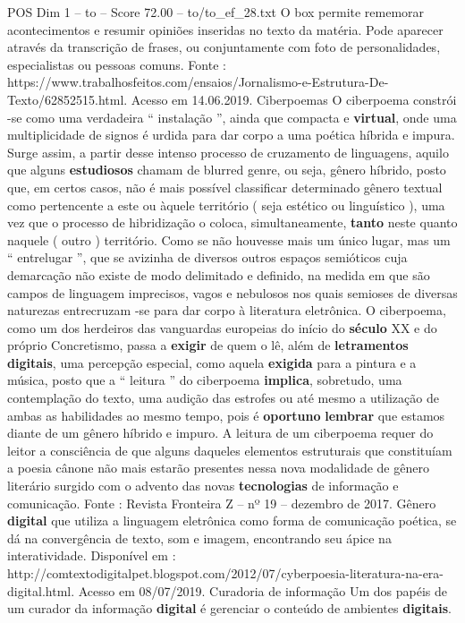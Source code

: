 \begin{textsample}{POS Dim 1 – to – Score 72.00 – to/to\_ef\_28.txt}
O box permite rememorar acontecimentos e resumir opiniões inseridas no texto da matéria.
Pode aparecer através da transcrição de frases, ou conjuntamente com foto de personalidades, especialistas ou pessoas comuns.
Fonte : https://www.trabalhosfeitos.com/ensaios/Jornalismo-e-Estrutura-De-Texto/62852515.html.
Acesso em 14.06.2019.
Ciberpoemas O ciberpoema constrói -se como uma verdadeira “ instalação ”, ainda que compacta e \textbf{virtual}, onde uma multiplicidade de signos é urdida para dar corpo a uma poética híbrida e impura.
Surge assim, a partir desse intenso processo de cruzamento de linguagens, aquilo que alguns \textbf{estudiosos} chamam de blurred genre, ou seja, gênero híbrido, posto que, em certos casos, não é mais possível classificar determinado gênero textual como pertencente a este ou àquele território ( seja estético ou linguístico ), uma vez que o processo de hibridização o coloca, simultaneamente, \textbf{tanto} neste quanto naquele ( outro ) território.
Como se não houvesse mais um único lugar, mas um “ entrelugar ”, que se avizinha de diversos outros espaços semióticos cuja demarcação não existe de modo delimitado e definido, na medida em que são campos de linguagem imprecisos, vagos e nebulosos nos quais semioses de diversas naturezas entrecruzam -se para dar corpo à literatura eletrônica.
O ciberpoema, como um dos herdeiros das vanguardas europeias do início do \textbf{século} XX e do próprio Concretismo, passa a \textbf{exigir} de quem o lê, além de \textbf{letramentos} \textbf{digitais}, uma percepção especial, como aquela \textbf{exigida} para a pintura e a música, posto que a “ leitura ” do ciberpoema \textbf{implica}, sobretudo, uma contemplação do texto, uma audição das estrofes ou até mesmo a utilização de ambas as habilidades ao mesmo tempo, pois é \textbf{oportuno} \textbf{lembrar} que estamos diante de um gênero híbrido e impuro.
A leitura de um ciberpoema requer do leitor a consciência de que alguns daqueles elementos estruturais que constituíam a poesia cânone não mais estarão presentes nessa nova modalidade de gênero literário surgido com o advento das novas \textbf{tecnologias} de informação e comunicação.
Fonte : Revista Fronteira Z – nº 19 – dezembro de 2017.
Gênero \textbf{digital} que utiliza a linguagem eletrônica como forma de comunicação poética, se dá na convergência de texto, som e imagem, encontrando seu ápice na interatividade.
Disponível em : http://comtextodigitalpet.blogspot.com/2012/07/cyberpoesia-literatura-na-era-digital.html.
Acesso em 08/07/2019.
Curadoria de informação Um dos papéis de um curador da informação \textbf{digital} é gerenciar o conteúdo de ambientes \textbf{digitais}.

\end{textsample}
